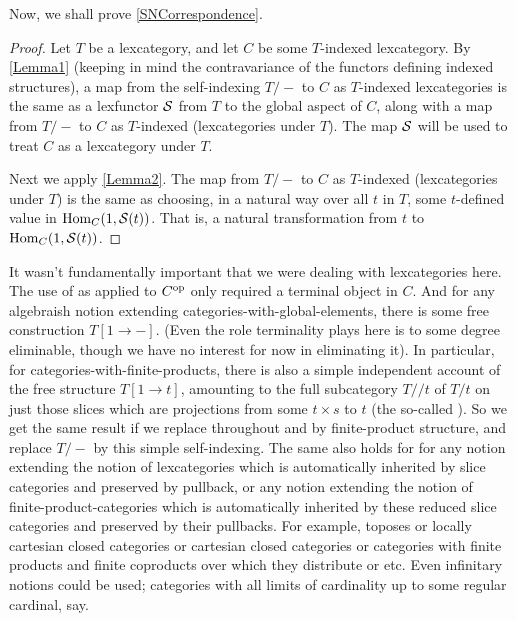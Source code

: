Now, we shall prove \cref{SNCorrespondence}.

\begin{proof}
Let $T$ be a lexcategory, and let $C$ be some $T$-indexed lexcategory. By \cref{Lemma1} (keeping in mind the contravariance of the functors defining indexed structures), a map from the self-indexing $T/-$ to $C$ as $T$-indexed lexcategories is the same as a lexfunctor $\mathcal{S}$ from $T$ to the global aspect of $C$, along with a map from $T/-$ to $C$ as $T$-indexed (lexcategories under $T$). The map $\mathcal{S}$ will be used to treat $C$ as a lexcategory under $T$.

Next we apply \cref{Lemma2}. The map from $T/-$ to $C$ as $T$-indexed (lexcategories under $T$) is the same as choosing, in a natural way over all $t$ in $T$, some $t$-defined value in $\operatorname{Hom}_C(1, \mathcal{S}(t))$. That is, a natural transformation from $t$ to $\operatorname{Hom}_C(1, \mathcal{S}(t))$.
\end{proof}

\begin{remark}\label{IntrospGeneralDoctrine}
It wasn't fundamentally important that we were dealing with lexcategories here. The use of  as applied to $C^{\mathrm{op}}$ only required a terminal object in $C$. And for any algebraish notion extending categories-with-global-elements, there is some free construction $T[1 \to -]$. (Even the role terminality plays here is to some degree eliminable, though we have no interest for now in eliminating it). In particular, for categories-with-finite-products, there is also a simple independent account of the free structure $T[1 \to t]$, amounting to the full subcategory $T//t$ of $T/t$ on just those slices which are projections from some $t \times s$ to $t$ (the so-called ). So we get the same result if we replace throughout  and  by finite-product structure, and replace $T/-$ by this simple self-indexing. The same also holds for for any notion extending the notion of lexcategories which is automatically inherited by slice categories and preserved by pullback, or any notion extending the notion of finite-product-categories which is automatically inherited by these reduced slice categories and preserved by their pullbacks. For example, toposes or locally cartesian closed categories or cartesian closed categories or categories with finite products and finite coproducts over which they distribute or etc. Even infinitary notions could be used; categories with all limits of cardinality up to some regular cardinal, say.
\end{remark}

